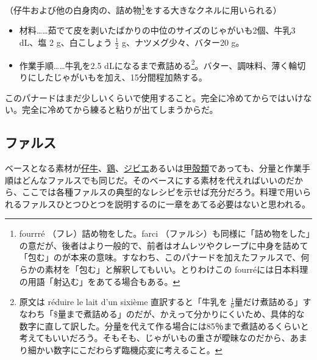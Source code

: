 \begin{recette}
（仔牛および他の白身肉の、詰め物\footnote{fourrré
  （フレ）詰め物をした。farci
  （ファルシ）も同様に「詰め物をした」の意だが、後者はより一般的で、前者はオムレツやクレープに中身を詰めて「包む」のが本来の意味。すなわち、このパナードを加えたファルスで、何らかの素材を「包む」と解釈してもいい。とりわけこの
  fourréには日本料理の用語「射込む」をあてる場合もある。}をする大きなクネルに用いられる）

\begin{itemize}
\item
  材料\ldots{}\ldots{}茹でて皮を剥いたばかりの中位のサイズのじゃがいも2個、牛乳3
  dL、塩 2 g、白こしょう \(\frac{1}{2}\) g、ナツメグ少々、バター20 g。
\item
  作業手順\ldots{}\ldots{}牛乳を2.5 dLになるまで煮詰める\footnote{原文は
    réduire le lait d'un sixième 直訳すると「牛乳を
    \(\frac{1}{6}\)量だけ煮詰める」すなわち「\$量まで煮詰める」のだが、かえって分かりにくいため、具体的な数字に直して訳した。分量を代えて作る場合には85％まで煮詰めるくらいと考えてもいいだろう。そもそも、じゃがいもの重さが曖昧なのだから、あまり細かい数字にこだわらず臨機応変に考えること。}。バター、調味料、薄く輪切りにしたじゃがいもを加え、15分間程加熱する。
\end{itemize}

このパナードはまだ少しいくらいで使用すること。完全に冷めてからではいけない。完全に冷めてから練ると粘りが出てしまうからだ。

\end{recette}

\begin{Main}

\hypertarget{farces}{%
\subsection{ファルス}\label{farces}}


 

ベースとなる素材が\ul{仔牛}、\ul{鶏}、\ul{ジビエ}あるいは\ul{甲殻類}であっても、分量と作業手順はどんなファルスでも同じだ。そのベースにする素材を代えればいいのだから、ここでは各種ファルスの典型的なレシピを示せば充分だろう。料理で用いられるファルスひとつひとつを説明するのに一章をあてる必要はないと思われる。

\end{Main}


